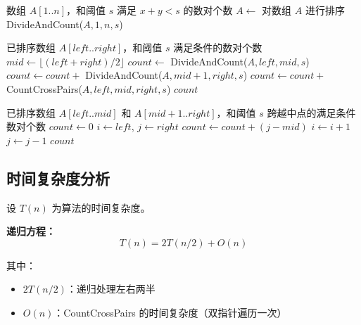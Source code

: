 \documentclass[UTF8,12pt,a4paper]{ctexart}
\begin{document}
\begin{algorithm}[H]
	\caption{CountPairs(A, s)}
	\begin{algorithmic}[1]
		\Require 数组 $A[1..n]$，和阈值 $s$
		\Ensure 满足 $x+y < s$ 的数对个数
		\State $A \gets$ 对数组 $A$ 进行排序
		\State \Return DivideAndCount($A, 1, n, s$)
	\end{algorithmic}
\end{algorithm}

\begin{algorithm}[H]
	\caption{DivideAndCount(A, left, right, s)}
	\begin{algorithmic}[1]
		\Require 已排序数组 $A[left..right]$，和阈值 $s$
		\Ensure 满足条件的数对个数
			\State {}
		\EndIf
		\State $mid \gets \lfloor (left + right) / 2 \rfloor$
		\State $count \gets$ DivideAndCount($A, left, mid, s$) 
		\State $count \gets count +$ DivideAndCount($A, mid+1, right, s$)
		\State $count \gets count +$ CountCrossPairs($A, left, mid, right, s$)
		\State \Return $count$
	\end{algorithmic}
\end{algorithm}

\begin{algorithm}[H]
	\caption{CountCrossPairs(A, left, mid, right, s)}
	\begin{algorithmic}[1]
		\Require 已排序数组 $A[left..mid]$ 和 $A[mid+1..right]$，和阈值 $s$
		\Ensure 跨越中点的满足条件数对个数
		\State $count \gets 0$
		\State $i \gets left$, $j \gets right$
				\State $count \gets count + (j - mid)$ 
				\State $i \gets i + 1$
			\Else
				\State $j \gets j - 1$
			\EndIf
		\EndWhile
		\State \Return $count$
	\end{algorithmic}
\end{algorithm}

\subsection*{时间复杂度分析}

设 $T(n)$ 为算法的时间复杂度。

\textbf{递归方程：}
$$T(n) = 2T(n/2) + O(n)$$

其中：
\begin{itemize}
	\item $2T(n/2)$：递归处理左右两半
	\item $O(n)$：CountCrossPairs 的时间复杂度（双指针遍历一次）
\end{itemize}
\end{document}
